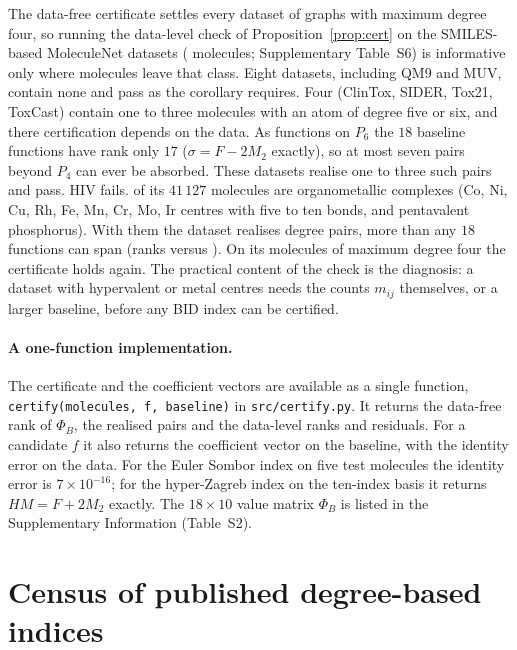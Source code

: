 \documentclass[11pt,a4paper]{article}
\theoremstyle{definition}
\begin{document}
The data-free certificate settles every dataset of graphs with maximum
degree four, so running the data-level check of
Proposition~\ref{prop:cert} on the \nGenDatasets{} SMILES-based
MoleculeNet datasets (\nGenMolecules{} molecules; Supplementary
Table~S6) is informative only where molecules leave that class. Eight
datasets, including QM9 and MUV, contain none and pass as the corollary
requires. Four (ClinTox, SIDER, Tox21, ToxCast) contain one to three
molecules with an atom of degree five or six, and there certification
depends on the data. As functions on $P_6$ the $18$ baseline functions
have rank only $17$ ($\sigma=F-2M_2$ exactly), so at most seven pairs
beyond $P_4$ can ever be absorbed. These datasets realise one to three
such pairs and pass. HIV fails. \hivHyper{} of its $41\,127$ molecules
are organometallic complexes (Co, Ni, Cu, Rh, Fe, Mn, Cr, Mo, Ir
centres with five to ten bonds, and pentavalent phosphorus). With
them the dataset realises \hivPairs{} degree pairs, more than any $18$
functions can span (ranks \hivRankM{} versus \hivRankB{}). On its \hivRestrictedN{}
molecules of maximum degree four the certificate holds again. The
practical content of the check is the diagnosis: a dataset with hypervalent or metal centres needs the
counts $m_{ij}$ themselves, or a larger baseline, before any BID index
can be certified.

\paragraph{A one-function implementation.} The certificate and the
coefficient vectors are available as a single function,
\texttt{certify(molecules, f, baseline)} in \texttt{src/certify.py}.
It returns the data-free rank of $\Phi_B$, the realised pairs and the
data-level ranks and residuals. For a candidate $f$ it also returns
the coefficient vector on the baseline, with the identity error on the
data. For the Euler Sombor index on five test molecules the identity
error is $7\times10^{-16}$; for the hyper-Zagreb index on the
ten-index basis it returns $HM=F+2M_2$ exactly. The $18\times10$ value
matrix $\Phi_B$ is listed in the Supplementary Information (Table~S2).

\section{Census of published degree-based indices}\label{sec:census}
\end{document}
